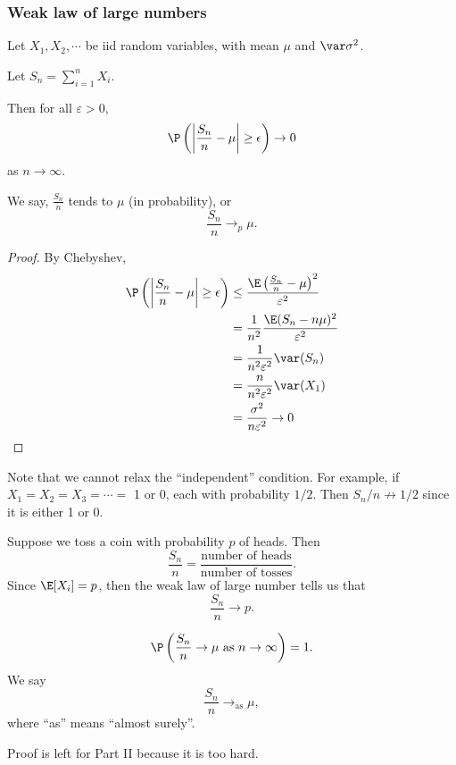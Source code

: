 \documentclass[a4paper]{article}
\begin{document}
\subsubsection{Weak law of large numbers}
\begin{thm}
  Let $X_1, X_2, \cdots$ be iid random variables, with mean $\mu$ and $\var \sigma^2$.
  
  Let $S_n = \sum_{i = 1}^n X_i$.

  Then for all $\varepsilon > 0$,
  \[
    \P\left(\left|\frac{S_n}{n} - \mu\right| \geq \epsilon\right) \to 0
  \]
  as $n\to \infty$.

  We say, $\frac{S_n}{n}$ tends to $\mu$ (in probability), or
  \[
    \frac{S_n}{n}\to_p \mu.
  \]
\end{thm}

\begin{proof}
  By Chebyshev,
  \begin{align*}
    \P\left(\left|\frac{S_n}{n} - \mu\right| \geq \epsilon\right)&\leq \frac{\E\left(\frac{S_n}{n} - \mu\right)^2}{\varepsilon^2}\\
    &= \frac{1}{n^2}\frac{\E(S_n -n\mu)^2}{\varepsilon^2}\\
    &= \frac{1}{n^2\varepsilon^2}\var (S_n)\\
    &= \frac{n}{n^2\varepsilon^2}\var (X_1)\\
    &= \frac{\sigma^2}{n\varepsilon^2} \to 0
  \end{align*}
\end{proof}

Note that we cannot relax the ``independent'' condition. For example, if $X_1 = X_2 = X_3 = \cdots = $ 1 or 0, each with probability $1/2$. Then $S_n/n \not\to 1/2$ since it is either 1 or 0.

\begin{eg}
  Suppose we toss a coin with probability $p$ of heads. Then
  \[
    \frac{S_n}{n} = \frac{\text{number of heads}}{\text{number of tosses}}.
  \]
  Since $\E[X_i] = p$, then the weak law of large number tells us that
  \[
    \frac{S_n}{n} \to p.
  \]
\end{eg}

\begin{thm}
  \[
    \P\left(\frac{S_n}{n}\to \mu\text{ as }n\to \infty\right) = 1.
  \]
  We say
  \[
    \frac{S_n}{n}\to_{\mathrm{as}} \mu,
  \]
  where ``as'' means ``almost surely''.
\end{thm}
Proof is left for Part II because it is too hard.
\end{document}

